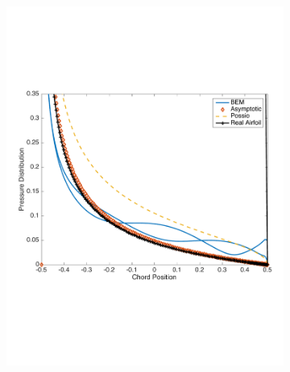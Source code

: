 \documentclass{article}
\begin{document}
\begin{figure}[h]
\centering
\begin{subfigure}{0.3\textwidth}
	\centering
	\includegraphics[width = \textwidth, height=0.2\textheight]{Pressure_k5}
\end{subfigure}%
\begin{subfigure}{0.3\textwidth}
	\centering

\end{subfigure}
\end{figure}
\end{document}
